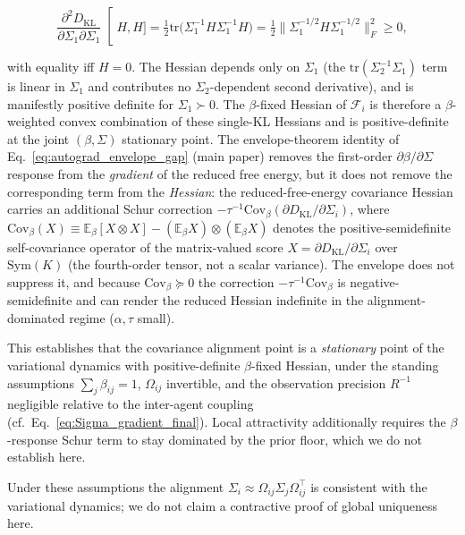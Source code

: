 \documentclass[twoside,11pt]{article}
\begin{document}
\begin{equation}
\left.\frac{\partial^2 D_{\mathrm{KL}}}{\partial \Sigma_1 \partial \Sigma_1}\right[H, H]
=
\tfrac{1}{2} \mathrm{tr}\big(\Sigma_1^{-1} H \Sigma_1^{-1} H\big)
=
\tfrac{1}{2} \big\|\Sigma_1^{-1/2} H \Sigma_1^{-1/2}\big\|_F^2 \geq 0,
\end{equation}

with equality iff $H = 0$. The Hessian depends only on $\Sigma_1$ (the $\mathrm{tr}(\Sigma_2^{-1}\Sigma_1)$ term is linear in $\Sigma_1$ and contributes no $\Sigma_2$-dependent second derivative), and is manifestly positive definite for $\Sigma_1 \succ 0$. The $\beta$-fixed Hessian of $\mathcal{F}_i$ is therefore a $\beta$-weighted convex combination of these single-KL Hessians and is positive-definite at the joint $(\beta, \Sigma)$ stationary point. The envelope-theorem identity of Eq.~\eqref{eq:autograd_envelope_gap} (main paper) removes the first-order $\partial\beta/\partial \Sigma$ response from the \emph{gradient} of the reduced free energy, but it does not remove the corresponding term from the \emph{Hessian}: the reduced-free-energy covariance Hessian carries an additional Schur correction $-\tau^{-1}\mathrm{Cov}_\beta(\partial D_{\mathrm{KL}}/\partial \Sigma_i)$, where $\mathrm{Cov}_\beta(X) \equiv \mathbb{E}_\beta[X \otimes X] - (\mathbb{E}_\beta X)\otimes(\mathbb{E}_\beta X)$ denotes the positive-semidefinite self-covariance operator of the matrix-valued score $X = \partial D_{\mathrm{KL}}/\partial \Sigma_i$ over $\mathrm{Sym}(K)$ (the fourth-order tensor, not a scalar variance). The envelope does not suppress it, and because $\mathrm{Cov}_\beta \succeq 0$ the correction $-\tau^{-1}\mathrm{Cov}_\beta$ is negative-semidefinite and can render the reduced Hessian indefinite in the alignment-dominated regime ($\alpha, \tau$ small).

This establishes that the covariance alignment point is a \emph{stationary} point of the variational dynamics with positive-definite $\beta$-fixed Hessian, under the standing assumptions $\sum_j \beta_{ij}=1$, $\Omega_{ij}$ invertible, and the observation precision $R^{-1}$ negligible relative to the inter-agent coupling (cf.\ Eq.~\eqref{eq:Sigma_gradient_final}). Local attractivity additionally requires the $\beta$-response Schur term to stay dominated by the prior floor, which we do not establish here.

Under these assumptions the alignment $\Sigma_i \approx \Omega_{ij}\Sigma_j\Omega_{ij}^\top$ is consistent with the variational dynamics; we do not claim a contractive proof of global uniqueness here.
\end{document}
